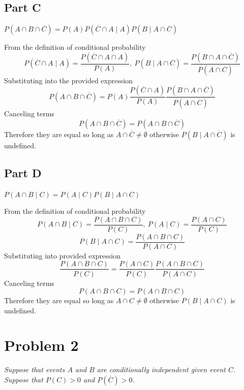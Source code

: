\documentclass{article}
\begin{document}
\subsection*{Part C}

\textit{$ P \left( A \cap B \cap \overline{C} \right) = P \left( A \right) P
\left( \overline{C} \cap A \mid A \right) P \left( B \mid A \cap \overline{C}
\right) $}

\bigbreak

From the definition of conditional probability
$$ P ( \overline{C} \cap A \mid A ) = \frac{ P ( \overline{C} \cap A \cap A ) }{
    P ( A ) },\ P ( B \mid A \cap \overline{C} ) = \frac{ P ( B \cap A \cap
\overline{C} ) }{ P ( A \cap \overline{C} ) } $$
Substituting into the provided expression
$$ P ( A \cap B \cap \overline{C} ) = P ( A ) \frac{ P ( \overline{C} \cap A )
}{ P ( A ) } \frac{ P ( B \cap A \cap \overline{C} ) }{ P ( A \cap \overline{C}
) } $$
Canceling terms
$$ P ( A \cap B \cap \overline{C} ) =  P ( A \cap B \cap \overline{C} ) $$
Therefore they are equal so long as $ A \cap \overline{C} \neq \emptyset $
otherwise $ P(B \mid A \cap \overline{C}) $ is undefined.

\subsection*{Part D}

\textit{$ P \left( A \cap B \mid C \right) = P \left( A \mid C \right) P \left(
B \mid A \cap C \right) $}

\bigbreak

From the definition of conditional probability
$$ P ( A \cap B \mid C ) = \frac{ P ( A \cap B \cap C ) }{ P ( C ) },\ P ( A
\mid C ) = \frac{ P ( A \cap C ) }{ P ( C ) } $$
$$ P ( B \mid A \cap C ) = \frac{ P ( A \cap B \cap C ) }{ P ( A \cap C ) } $$
Substituting into provided expression
$$ \frac{ P ( A \cap B \cap C ) }{ P ( C ) } = \frac{ P ( A \cap C ) }{ P ( C )
} \frac{ P ( A \cap B \cap C ) }{ P ( A \cap C ) } $$
Canceling terms
$$ P ( A \cap B \cap C ) =  P ( A \cap B \cap C ) $$
Therefore they are equal so long as $ A \cap C \neq \emptyset $ otherwise $ P(B
\mid A \cap C) $ is undefined.

\section*{Problem 2}

\textit{Suppose that events $ A $ and $ B $ are conditionally independent given
event $ C $. Suppose that $ P \left( C \right) > 0 $ and $ P \left( \overline{C}
\right) > 0 $.}
\end{document}
